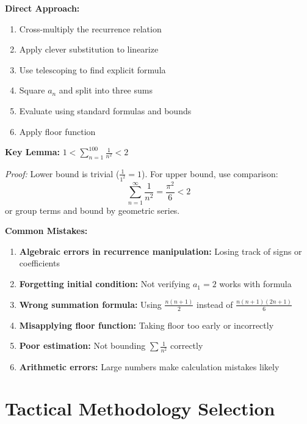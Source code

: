 \documentclass[12pt]{article}
\begin{document}
\begin{strategicbox}
\textbf{Direct Approach:}
\begin{enumerate}
    \item Cross-multiply the recurrence relation
    \item Apply clever substitution to linearize
    \item Use telescoping to find explicit formula
    \item Square $a_n$ and split into three sums
    \item Evaluate using standard formulas and bounds
    \item Apply floor function
\end{enumerate}

\textbf{Key Lemma:} $1 < \sum_{n=1}^{100} \frac{1}{n^2} < 2$

\textit{Proof:} Lower bound is trivial ($\frac{1}{1^2} = 1$). For upper bound, use comparison:
\[\sum_{n=1}^{\infty} \frac{1}{n^2} = \frac{\pi^2}{6} < 2\]
or group terms and bound by geometric series.

\end{strategicbox}

\begin{warningbox}
\textbf{Common Mistakes:}
\begin{enumerate}
    \item \textbf{Algebraic errors in recurrence manipulation:} Losing track of signs or coefficients
    \item \textbf{Forgetting initial condition:} Not verifying $a_1 = 2$ works with formula
    \item \textbf{Wrong summation formula:} Using $\frac{n(n+1)}{2}$ instead of $\frac{n(n+1)(2n+1)}{6}$
    \item \textbf{Misapplying floor function:} Taking floor too early or incorrectly
    \item \textbf{Poor estimation:} Not bounding $\sum \frac{1}{n^2}$ correctly
    \item \textbf{Arithmetic errors:} Large numbers make calculation mistakes likely
\end{enumerate}
\end{warningbox}

\section{Tactical Methodology Selection}
\end{document}
